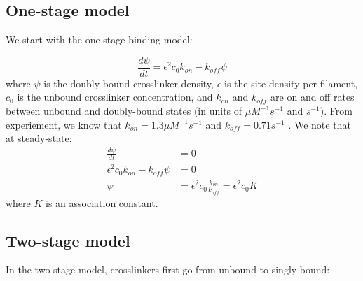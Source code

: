 \documentclass{article}[12pt]
\begin{document}
\subsection{One-stage model}
We start with the one-stage binding model:

\begin{equation}
	\frac{d\psi}{dt} = \epsilon^2 c_0 k_{on} - k_{off} \psi \label{eq:1}
\end{equation}
where $\psi$ is the doubly-bound crosslinker density, $\epsilon$ is the site density per filament, $c_0$ is the unbound crosslinker concentration, and $k_{on}$ and $k_{off}$ are on and off rates between unbound and doubly-bound states (in units of $\mu M^{-1} s^{-1}$ and $s^{-1}$). From experiement, we know that $k_{on} = 1.3 \mu M ^{-1} s^{-1}$ and $k_{off} = 0.71 s^{-1}$ \cite{goldmann1993analysis}. We note that at steady-state:
\begin{align*}
	\frac{d\psi}{dt} &= 0\\
	\epsilon^2 c_0 k_{on} - k_{off} \psi &= 0\\
	\psi &= \epsilon^2 c_0 \frac{k_{on}}{k_{off}} = \epsilon^2 c_0 K
\end{align*}
where $K$ is an association constant.\\
	
\subsection{Two-stage model}
In the two-stage model, crosslinkers first go from unbound to singly-bound:
\end{document}
